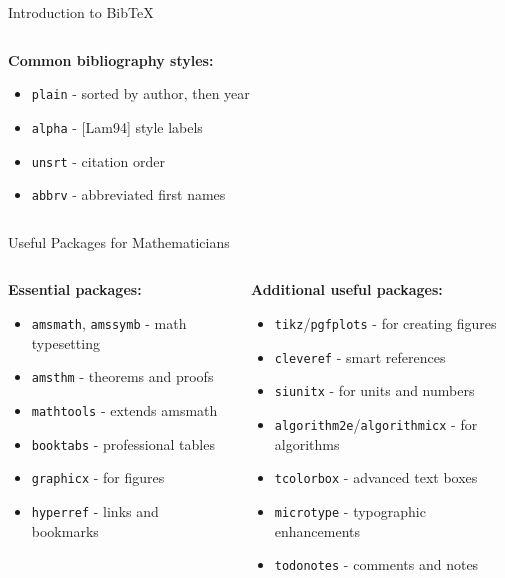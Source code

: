 \begin{frame}[fragile]{Introduction to BibTeX}
\begin{columns}
\begin{column}{0.5\textwidth}
               \textbf{Common bibliography styles:}
               \begin{itemize}
                    \item \texttt{plain} - sorted by author, then year
                    \item \texttt{alpha} - [Lam94] style labels
                    \item \texttt{unsrt} - citation order
                    \item \texttt{abbrv} - abbreviated first names
               \end{itemize}
          \end{column}
     \end{columns}
\end{frame}

\begin{frame}[fragile]{Useful Packages for Mathematicians}
     \begin{columns}
          \begin{column}{0.5\textwidth}
               \textbf{Essential packages:}
               \begin{itemize}
                    \item \texttt{amsmath}, \texttt{amssymb} - math typesetting
                    \item \texttt{amsthm} - theorems and proofs
                    \item \texttt{mathtools} - extends amsmath
                    \item \texttt{booktabs} - professional tables
                    \item \texttt{graphicx} - for figures
                    \item \texttt{hyperref} - links and bookmarks
               \end{itemize}
          \end{column}
          
          \begin{column}{0.5\textwidth}
               \textbf{Additional useful packages:}
               \begin{itemize}
                    \item \texttt{tikz}/\texttt{pgfplots} - for creating figures
                    \item \texttt{cleveref} - smart references
                    \item \texttt{siunitx} - for units and numbers
                    \item \texttt{algorithm2e}/\texttt{algorithmicx} - for algorithms
                    \item \texttt{tcolorbox} - advanced text boxes
                    \item \texttt{microtype} - typographic enhancements
                    \item \texttt{todonotes} - comments and notes
               \end{itemize}
          \end{column}
     \end{columns}
     

\end{frame}
